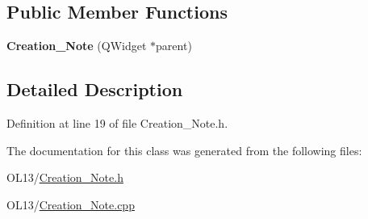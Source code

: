 \subsection*{Public Member Functions}
\begin{DoxyCompactItemize}
\item 
\mbox{\label{class_creation___note_a76278cf9f0de87cd61f204aafcebd5d2}} 
{\bfseries Creation\+\_\+\+Note} (Q\+Widget $\ast$parent)
\end{DoxyCompactItemize}


\subsection{Detailed Description}


Definition at line 19 of file Creation\+\_\+\+Note.\+h.



The documentation for this class was generated from the following files\+:\begin{DoxyCompactItemize}
\item 
O\+L13/\hyperlink{_creation___note_8h}{Creation\+\_\+\+Note.\+h}\item 
O\+L13/\hyperlink{_creation___note_8cpp}{Creation\+\_\+\+Note.\+cpp}\end{DoxyCompactItemize}
